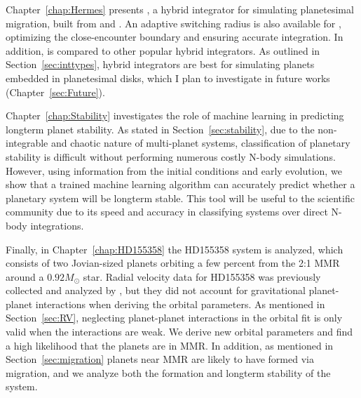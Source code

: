 Chapter~\ref{chap:Hermes} presents \hermes, a hybrid integrator for simulating planetesimal migration, built from \ias \citep{Rein2015a} and \whfast \citep{Rein2015b}. 
An adaptive switching radius is also available for \hermes, optimizing the close-encounter boundary and ensuring accurate integration.
In addition, \hermes is compared to other popular hybrid integrators. 
As outlined in Section~\ref{sec:inttypes}, hybrid integrators are best for simulating planets embedded in planetesimal disks, which I plan to investigate in future works (Chapter~\ref{sec:Future}). 

Chapter~\ref{chap:Stability} investigates the role of machine learning in predicting longterm planet stability. 
As stated in Section~\ref{sec:stability}, due to the non-integrable and chaotic nature of multi-planet systems, classification of planetary stability is difficult without performing numerous costly N-body simulations. 
However, using information from the initial conditions and early evolution, we show that a trained machine learning algorithm can accurately predict whether a planetary system will be longterm stable.  
This tool will be useful to the scientific community due to its speed and accuracy in classifying systems over direct N-body integrations.  

Finally, in Chapter~\ref{chap:HD155358} the HD155358 system is analyzed, which consists of two Jovian-sized planets orbiting a few percent from the 2:1 MMR around a $0.92M_{\odot}$ star. 
Radial velocity data for HD155358 was previously collected and analyzed by \citet{Robertson2012}, but they did not account for gravitational planet-planet interactions when deriving the orbital parameters.
As mentioned in Section~\ref{sec:RV}, neglecting planet-planet interactions in the orbital fit is only valid when the interactions are weak. 
We derive new orbital parameters and find a high likelihood that the planets are in MMR.
In addition, as mentioned in Section~\ref{sec:migration} planets near MMR are likely to have formed via migration, and we analyze both the formation and longterm stability of the system. 
